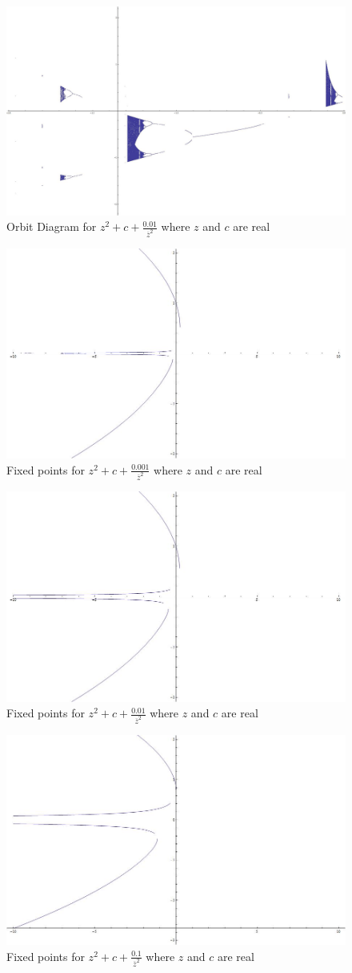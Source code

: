 \documentclass[10pt]{article}
\begin{document}
\begin{figure}[H]\centering\includegraphics[width=.6\textwidth]{orbit_real_beta01.jpg}\caption{Orbit Diagram for $z^{2} + c + \frac{0.01}{ \overline{z}^{2}}$ where $z$ and $c$ are real}\end{figure}

\begin{figure}[H]\centering\includegraphics[width=.6\textwidth]{fixed_points_real_001.jpg}\caption{Fixed points for $z^{2} + c + \frac{0.001}{ \overline{z}^{2}}$ where $z$ and $c$ are real}\end{figure}

\begin{figure}[H]\centering\includegraphics[width=.6\textwidth]{fixed_points_real_01.jpg}\caption{Fixed points for $z^{2} + c + \frac{0.01}{ \overline{z}^{2}}$ where $z$ and $c$ are real}\end{figure}

\begin{figure}[H]\centering\includegraphics[width=.6\textwidth]{fixed_points_real_1.jpg}\caption{Fixed points for $z^{2} + c + \frac{0.1}{ \overline{z}^{2}}$ where $z$ and $c$ are real}\end{figure}
\end{document}
